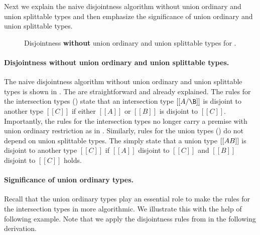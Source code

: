 Next we explain the naive disjointness algorithm
without union ordinary and union splittable types and then
emphasize the significance of union ordinary and union splittable types.


\begin{figure}[t]
  \begin{small}
    \centering
  \end{small}
  \caption{Disjointness \textbf{without} union ordinary and union splittable types for \name.}
  \label{fig:union:rev:disj:naive}
\end{figure}


\paragraph{Disjointness \textbf{without} union ordinary and
union splittable types.}
The naive disjointness algorithm without union ordinary and
union splittable types is shown
in .
The  are straightforward and already explained.
The rules for the intersection types
() state
that an intersection type $[[A/\B]]$ is disjoint to another type $[[C]]$ if 
either $[[A]]$ or $[[B]]$ is disjoint to $[[C]]$. Importantly, the rules for 
the intersection types no longer carry a premise with union ordinary 
restriction as in .
Similarly, rules for the union types ()
do not depend on union 
splittable types. The  simply state that a
union type $[[A\/B]]$ 
is disjoint to another type $[[C]]$ if $[[A]]$ disjoint to $[[C]]$ and 
$[[B]]$ disjoint to $[[C]]$ holds.

\paragraph{Significance of union ordinary types.}
Recall that the union ordinary types play an essential role to make
the rules for the intersection types in 
more algorithmic.
We illustrate this with the help of following example.
Note that we apply the disjointness rules from  
in the following derivation.

